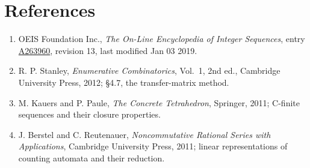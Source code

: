 \documentclass[11pt]{article}
\theoremstyle{definition}
\begin{document}
\section{References}

\begin{enumerate}

\item OEIS Foundation Inc., \emph{The On-Line Encyclopedia of Integer Sequences}, entry \href{https://oeis.org/A263960}{A263960}, revision 13, last modified Jan 03 2019.

\item R. P. Stanley, \emph{Enumerative Combinatorics}, Vol.~1, 2nd ed., Cambridge University Press, 2012; \S4.7, the transfer-matrix method.

\item M. Kauers and P. Paule, \emph{The Concrete Tetrahedron}, Springer, 2011; C-finite sequences and their closure properties.

\item J. Berstel and C. Reutenauer, \emph{Noncommutative Rational Series with Applications}, Cambridge University Press, 2011; linear representations of counting automata and their reduction.

\end{enumerate}
\end{document}
